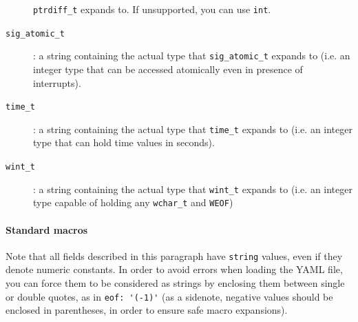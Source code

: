 \begin{description}
  \verb+ptrdiff_t+ expands to. If unsupported, you can use \verb+int+.
\item[\texttt{sig\_atomic\_t}]: a string containing the actual type that
  \verb+sig_atomic_t+ expands to (i.e. an integer type that can be
  accessed atomically even in presence of interrupts).
\item[\texttt{time\_t}]: a string containing the actual type that
  \verb+time_t+ expands to (i.e. an integer type that can hold time
  values in seconds).
\item[\texttt{wint\_t}]: a string containing the actual type that
  \verb+wint_t+ expands to (i.e. an integer type capable of holding any
  \verb+wchar_t+ and \verb+WEOF+)
\end{description}

\paragraph{Standard macros}

Note that all fields described in this paragraph have \texttt{string} values,
even if they denote numeric constants. In order to avoid errors when loading the
YAML file, you can force them to be considered as strings by enclosing them between
single or double quotes, as in \verb+eof: '(-1)'+ (as a sidenote, negative values
should be enclosed in parentheses, in order to ensure safe macro expansions).

